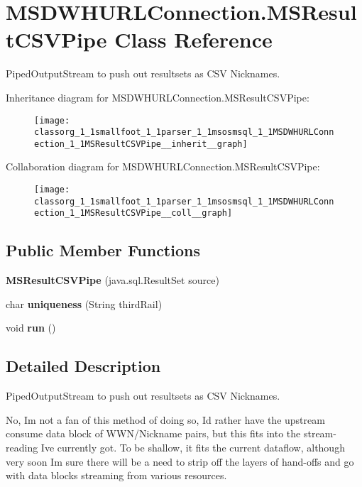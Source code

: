 \section{M\+S\+D\+W\+H\+U\+R\+L\+Connection.\+M\+S\+Result\+C\+S\+V\+Pipe Class Reference}
\label{classorg_1_1smallfoot_1_1parser_1_1msosmsql_1_1MSDWHURLConnection_1_1MSResultCSVPipe}


Piped\+Output\+Stream to push out resultsets as C\+S\+V Nicknames.  




Inheritance diagram for M\+S\+D\+W\+H\+U\+R\+L\+Connection.\+M\+S\+Result\+C\+S\+V\+Pipe\+:\nopagebreak
\begin{figure}[H]
\begin{center}
\leavevmode
\texttt{[image: classorg\_1\_1smallfoot\_1\_1parser\_1\_1msosmsql\_1\_1MSDWHURLConnection\_1\_1MSResultCSVPipe\_\_inherit\_\_graph]}
\end{center}
\end{figure}


Collaboration diagram for M\+S\+D\+W\+H\+U\+R\+L\+Connection.\+M\+S\+Result\+C\+S\+V\+Pipe\+:\nopagebreak
\begin{figure}[H]
\begin{center}
\leavevmode
\texttt{[image: classorg\_1\_1smallfoot\_1\_1parser\_1\_1msosmsql\_1\_1MSDWHURLConnection\_1\_1MSResultCSVPipe\_\_coll\_\_graph]}
\end{center}
\end{figure}
\subsection*{Public Member Functions}
\begin{DoxyCompactItemize}
\item 
{\bf M\+S\+Result\+C\+S\+V\+Pipe} (java.\+sql.\+Result\+Set source)
\item 
char {\bf uniqueness} (String third\+Rail)
\item 
void {\bf run} ()
\end{DoxyCompactItemize}


\subsection{Detailed Description}
Piped\+Output\+Stream to push out resultsets as C\+S\+V Nicknames. 

No, I\textquotesingle{}m not a fan of this method of doing so, I\textquotesingle{}d rather have the upstream consume data block of W\+W\+N/\+Nickname pairs, but this fits into the stream-\/reading I\textquotesingle{}ve currently got. To be shallow, it fits the current dataflow, although very soon I\textquotesingle{}m sure there will be a need to strip off the layers of hand-\/offs and go with data blocks streaming from various resources. 

